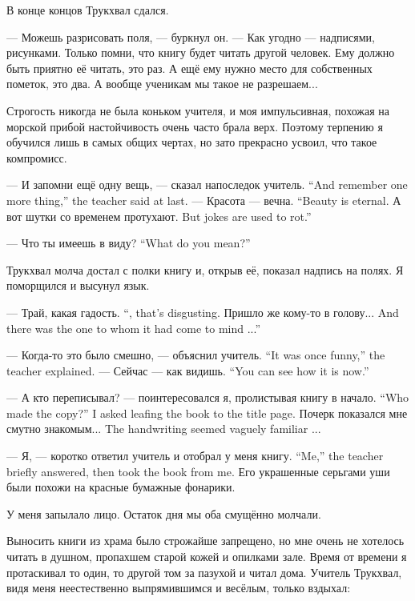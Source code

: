 В конце концов Трукхвал сдался.

--- Можешь разрисовать поля, --- буркнул он.
--- Как угодно --- надписями, рисунками.
Только помни, что книгу будет читать другой человек.
Ему должно быть приятно её читать, это раз.
А ещё ему нужно место для собственных пометок, это два.
А вообще ученикам мы такое не разрешаем...

Строгость никогда не была коньком учителя, и моя импульсивная, похожая на морской прибой настойчивость очень часто брала верх.
Поэтому терпению я обучился лишь в самых общих чертах, но зато прекрасно усвоил, что такое компромисс.

{--- И запомни ещё одну вещь, --- сказал напоследок учитель.}
{``And remember one more thing,'' the teacher said at last.}
{--- Красота --- вечна.}
{``Beauty is eternal.}
{А вот шутки со временем протухают.}
{But jokes are used to rot.''}

{--- Что ты имеешь в виду?}
{``What do you mean?''}

Трукхвал молча достал с полки книгу и, открыв её, показал надпись на полях.
Я поморщился и высунул язык.

{--- Трай, какая гадость.}
{``\Trai, that's disgusting.}
{Пришло же кому-то в голову...}
{And there was the one to whom it had come to mind ...''}

{--- Когда-то это было смешно, --- объяснил учитель.}
{``It was once funny,'' the teacher explained.}
{--- Сейчас --- как видишь.}
{``You can see how it is now.''}

{--- А кто переписывал? --- поинтересовался я, пролистывая книгу в начало.}
{``Who made the copy?'' I asked leafing the book to the title page.}
{Почерк показался мне смутно знакомым...}
{The handwriting seemed vaguely familiar ...}

{--- Я, --- коротко ответил учитель и отобрал у меня книгу.}
{``Me,'' the teacher briefly answered, then took the book from me.}
Его украшенные серьгами уши были похожи на красные бумажные фонарики.

У меня запылало лицо.
Остаток дня мы оба смущённо молчали.

Выносить книги из храма было строжайше запрещено, но мне очень не хотелось читать в душном, пропахшем старой кожей и опилками зале.
Время от времени я протаскивал то один, то другой том за пазухой и читал дома.
Учитель Трукхвал, видя меня неестественно выпрямившимся и весёлым, только вздыхал:

